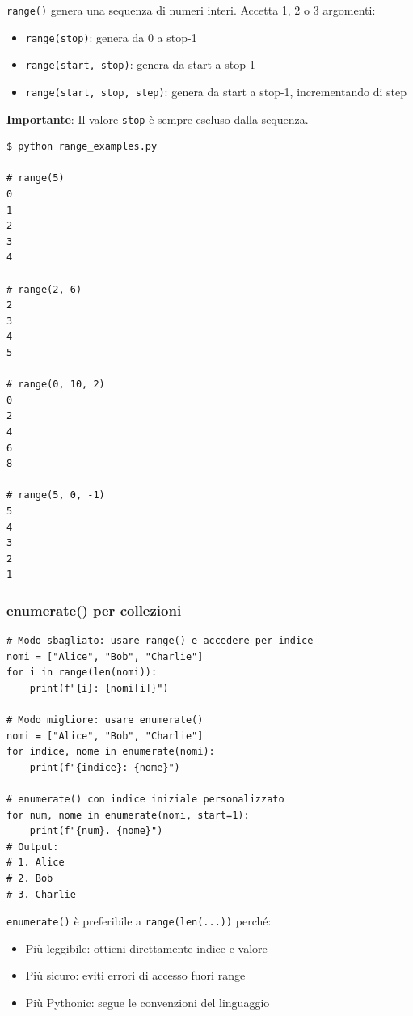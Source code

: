 \begin{tcolorbox}[title=Come funziona range()]
\texttt{range()} genera una sequenza di numeri interi. Accetta 1, 2 o 3 argomenti:
\begin{itemize}
  \item \texttt{range(stop)}: genera da 0 a stop-1
  \item \texttt{range(start, stop)}: genera da start a stop-1
  \item \texttt{range(start, stop, step)}: genera da start a stop-1, incrementando di step
\end{itemize}
\textbf{Importante}: Il valore \texttt{stop} è sempre escluso dalla sequenza.
\end{tcolorbox}

\begin{tcolorbox}[title=Terminal Output - Esempi range()]
\begin{verbatim}
$ python range_examples.py

# range(5)
0
1
2
3
4

# range(2, 6)
2
3
4
5

# range(0, 10, 2)
0
2
4
6
8

# range(5, 0, -1)
5
4
3
2
1
\end{verbatim}
\end{tcolorbox}

\subsubsection{enumerate() per collezioni}
\label{subsubsec:cf-enumerate}
\begin{lstlisting}
# Modo sbagliato: usare range() e accedere per indice
nomi = ["Alice", "Bob", "Charlie"]
for i in range(len(nomi)):
    print(f"{i}: {nomi[i]}")

# Modo migliore: usare enumerate()
nomi = ["Alice", "Bob", "Charlie"]
for indice, nome in enumerate(nomi):
    print(f"{indice}: {nome}")

# enumerate() con indice iniziale personalizzato
for num, nome in enumerate(nomi, start=1):
    print(f"{num}. {nome}")
# Output:
# 1. Alice
# 2. Bob
# 3. Charlie
\end{lstlisting}

\begin{tcolorbox}[title=Perché usare enumerate()]
\texttt{enumerate()} è preferibile a \texttt{range(len(...))} perché:
\begin{itemize}
  \item Più leggibile: ottieni direttamente indice e valore
  \item Più sicuro: eviti errori di accesso fuori range
  \item Più Pythonic: segue le convenzioni del linguaggio
\end{itemize}
\end{tcolorbox}

